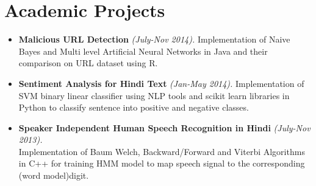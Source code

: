 \documentclass[margin,line]{resume}
\begin{document}
\begin{resume}
\begin{itemize}
    \end{itemize}



    \section{\mysidestyle Academic Projects}	
       \begin{itemize}
	        \item \textbf{Malicious URL Detection}\textsl{ (July-Nov 2014).} Implementation of Naive Bayes and Multi level Artificial Neural Networks in Java and their comparison on URL dataset using R.
            \item \textbf{Sentiment Analysis for Hindi Text}\textsl{ (Jan-May 2014).} Implementation of SVM binary linear classifier using NLP tools and scikit learn libraries in Python to classify sentence into positive and negative classes.
            \item \textbf{Speaker Independent Human Speech Recognition in Hindi}\textsl{ (July-Nov 2013).}\\ Implementation of Baum Welch, Backward/Forward and Viterbi Algorithms in C++ for training HMM model to map speech signal to the corresponding (word model)digit.
       \end{itemize}

\end{resume}
\end{document}
